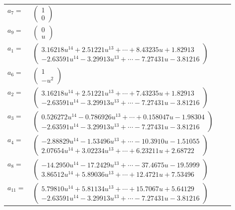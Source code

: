 \documentclass[1p]{elsarticle_modified}
\theoremstyle{definition}
\begin{document}
\begin{tabular}{m{7pt} m{180pt} m{7pt} m{180pt} }
\flushright $a_{7}=$&$\begin{pmatrix}1\\0\end{pmatrix}$ \\
\flushright $a_{9}=$&$\begin{pmatrix}0\\u\end{pmatrix}$ \\
\flushright $a_{1}=$&$\begin{pmatrix}3.16218 u^{14}+2.51221 u^{13}+\cdots+8.43235 u+1.82913\\-2.63591 u^{14}-3.29913 u^{13}+\cdots-7.27431 u-3.81216\end{pmatrix}$ \\
\flushright $a_{6}=$&$\begin{pmatrix}1\\- u^2\end{pmatrix}$ \\
\flushright $a_{2}=$&$\begin{pmatrix}3.16218 u^{14}+2.51221 u^{13}+\cdots+7.43235 u+1.82913\\-2.63591 u^{14}-3.29913 u^{13}+\cdots-7.27431 u-3.81216\end{pmatrix}$ \\
\flushright $a_{3}=$&$\begin{pmatrix}0.526272 u^{14}-0.786926 u^{13}+\cdots+0.158047 u-1.98304\\-2.63591 u^{14}-3.29913 u^{13}+\cdots-7.27431 u-3.81216\end{pmatrix}$ \\
\flushright $a_{4}=$&$\begin{pmatrix}-2.88829 u^{14}-1.53496 u^{13}+\cdots-10.3910 u-1.51055\\2.07654 u^{14}+3.02234 u^{13}+\cdots+6.23211 u+2.68722\end{pmatrix}$ \\
\flushright $a_{8}=$&$\begin{pmatrix}-14.2950 u^{14}-17.2429 u^{13}+\cdots-37.4675 u-19.5999\\3.86512 u^{14}+5.89036 u^{13}+\cdots+12.4721 u+7.53496\end{pmatrix}$ \\
\flushright $a_{11}=$&$\begin{pmatrix}5.79810 u^{14}+5.81134 u^{13}+\cdots+15.7067 u+5.64129\\-2.63591 u^{14}-3.29913 u^{13}+\cdots-7.27431 u-3.81216\end{pmatrix}$ \\

\end{tabular}
\end{document}
